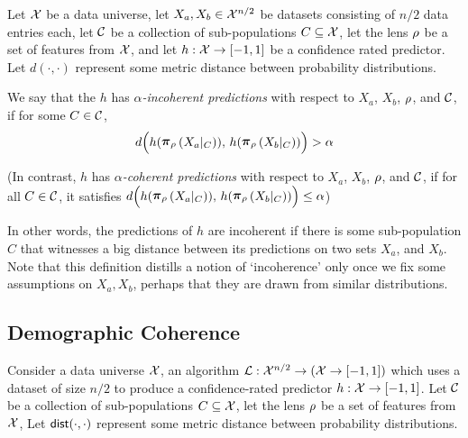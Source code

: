\begin{itemize}[leftmargin=*,itemsep=0pt]
\begin{definition}\label{def:incoherent-predictor}
    Let $\mathcal{X}$ be a data universe, let $X_a, X_b \in \mathcal{X}^{n/2}$ be datasets consisting of $n/2$ data entries each, let $\mathcal{C}$ be a collection of sub-populations $C \subseteq \mathcal{X}$, let the lens $\rho$ be a set of features from $\mathcal{X}$, and let $h: \mathcal{X} \to [-1,1]$ be a confidence rated predictor. Let $d(\cdot,\cdot)$ represent some metric distance between probability distributions.
    
     \medskip\noindent
     We say that the $h$ has \emph{$\alpha$-incoherent predictions} with respect to $X_a$, $X_b$, $\rho$, and $\mathcal{C}$, if for some $C \in \mathcal{C}$, 
     \[ d\Big(h(\restrict{X_a|_C}{\selection}),\, h(\restrict{X_b|_C}{\selection})\Big) > \alpha \] 
    
    \medskip\noindent
    (In contrast, $h$ has \emph{$\alpha$-coherent predictions} with respect to $X_a$, $X_b$, $\rho$, and $\mathcal{C}$, if for all $C \in \mathcal{C}$, it satisfies $d\Big(h(\restrict{X_a|_C}{\selection}),\, h(\restrict{X_b|_C}{\selection})\Big) \leq \alpha$)
\end{definition}

\medskip\noindent
In other words, the predictions of $h$ are incoherent if there is some sub-population $C$ that witnesses a big distance between its predictions on two sets $X_a$, and $X_b$. Note that this definition distills a notion of `incoherence' only once we fix some assumptions on $X_a,X_b$, perhaps that they are drawn from similar distributions. 

\subsection{Demographic Coherence}\label{sec:def-demcoh}

Consider a data universe $\mathcal{X}$, an algorithm $\mathcal{L}: \mathcal{X}^{n/2}\to (\mathcal{X} \to [-1,1])$ which uses a dataset of size $n/2$ to produce a confidence-rated predictor $h: \mathcal{X} \to [-1,1]$. Let $\mathcal{C}$ be a collection of sub-populations $C \subseteq \mathcal{X}$, let the lens $\rho$ be a set of features from $\mathcal{X}$,  Let $\mathsf{dist}(\cdot,\cdot)$ represent some metric distance between probability distributions.

\end{itemize}
